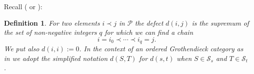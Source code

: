 \documentclass[11pt]{article}
\theoremstyle{plain}
\theoremstyle{nonumberplain}
\theoremstyle{plain}
\newtheorem{definition}[lemma]{Definition}
\numberwithin{equation}{section}
\theoremstyle{nonumberplain}
\newcommand\bC{{\mathbb C}}
\newcommand\cP{{\mathcal P}}
\newcommand\cS{{\mathcal S}}
\newcommand\fgl{\mathfrak{gl}}
\newcommand\1{{\bf 1}}
\begin{document}
Recall (\cite[\S 3.2]{us0} or \cite[Definition 2.8]{us1}):

\begin{definition}\label{def:defect}
  For two elements $i\prec j$ in $\cP$ the {\it defect} $d(i,j)$ is the supremum of the set of non-negative integers $q$ for which we can find a chain
  \begin{equation*}
    i=i_0\prec \cdots\prec i_q=j.
  \end{equation*}
We put also $d(i,i):=0$. In the context of an ordered Grothendieck category as in  we adopt the simplified notation $d(S,T)$ for $d(s,t)$ when $S\in \cS_s$ and $T\in \cS_t$.  
\end{definition}

\end{document}
